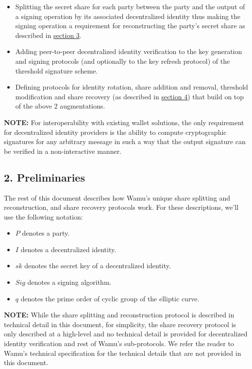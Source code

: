 \documentclass[
]{article}
\providecommand{\tightlist}{%
  \setlength{\itemsep}{0pt}\setlength{\parskip}{0pt}}
\begin{document}
\begin{itemize}
\tightlist
\item
  Splitting the secret share for each party between the party and the
  output of a signing operation by its associated decentralized identity
  thus making the signing operation a requirement for reconstructing the
  party's secret share as described in
  \protect\hyperlink{share-splitting-and-reconstruction}{section 3}.
\item
  Adding peer-to-peer decentralized identity verification to the key
  generation and signing protocols (and optionally to the key refresh
  protocol) of the threshold signature scheme.
\item
  Defining protocols for identity rotation, share addition and removal,
  threshold modification and share recovery (as described in
  \protect\hyperlink{share-recovery}{section 4}) that build on top of
  the above 2 augmentations.
\end{itemize}

\textbf{NOTE:} For interoperability with existing wallet solutions, the
only requirement for decentralized identity providers is the ability to
compute cryptographic signatures for any arbitrary message in such a way
that the output signature can be verified in a non-interactive manner.

\hypertarget{preliminaries}{%
\subsection{2. Preliminaries}\label{preliminaries}}

The rest of this document describes how Wamu's unique share splitting
and reconstruction, and share recovery protocols work. For these
descriptions, we'll use the following notation:

\begin{itemize}
\tightlist
\item
  \(P\) denotes a party.
\item
  \(I\) denotes a decentralized identity.
\item
  \(sk\) denotes the secret key of a decentralized identity.
\item
  \(Sig\) denotes a signing algorithm.
\item
  \(q\) denotes the prime order of cyclic group of the elliptic curve.
\end{itemize}

\textbf{NOTE:} While the share splitting and reconstruction protocol is
described in technical detail in this document, for simplicity, the
share recovery protocol is only described at a high-level and no
technical detail is provided for decentralized identity verification and
rest of Wamu's sub-protocols. We refer the reader to Wamu's technical
specification for the technical details that are not provided in this
document.
\end{document}
